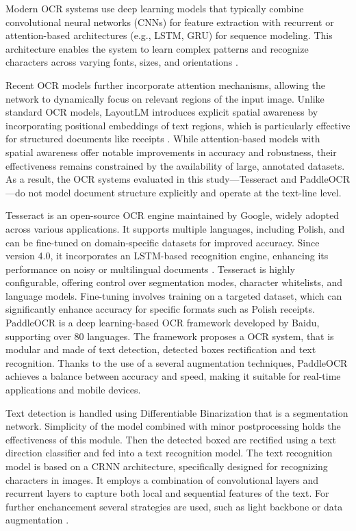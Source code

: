 \documentclass{SGGW-thesis-EN}
\begin{document}
Modern OCR systems use deep learning models that typically combine convolutional neural networks (CNNs) for feature extraction with recurrent or attention-based architectures (e.g., LSTM, GRU) for sequence modeling. This architecture enables the system to learn complex patterns and recognize characters across varying fonts, sizes, and orientations \cite{shi2016endtoend}.

Recent OCR models further incorporate attention mechanisms, allowing the network to dynamically focus on relevant regions of the input image. Unlike standard OCR models, LayoutLM introduces explicit spatial awareness by incorporating positional embeddings of text regions, which is particularly effective for structured documents like receipts \cite{li2020layoutlm}.
While attention-based models with spatial awareness offer notable improvements in accuracy and robustness, their effectiveness remains constrained by the availability of large, annotated datasets. As a result, the OCR systems evaluated in this study—Tesseract and PaddleOCR—do not model document structure explicitly and operate at the text-line level.

Tesseract is an open-source OCR engine maintained by Google, widely adopted across various applications. It supports multiple languages, including Polish, and can be fine-tuned on domain-specific datasets for improved accuracy. Since version 4.0, it incorporates an LSTM-based recognition engine, enhancing its performance on noisy or multilingual documents \cite{smith2007overview, smith2013history}. Tesseract is highly configurable, offering control over segmentation modes, character whitelists, and language models. Fine-tuning involves training on a targeted dataset, which can significantly enhance accuracy for specific formats such as Polish receipts.
\newpage
PaddleOCR is a deep learning-based OCR framework developed by Baidu, supporting over 80 languages. The framework proposes a OCR system,
that is modular and made of text detection, detected boxes rectification and text recognition. Thanks to the use of a several augmentation techniques, PaddleOCR achieves a balance between accuracy and speed, 
making it suitable for real-time applications and mobile devices.

Text detection is handled using Differentiable Binarization that is a segmentation network. Simplicity of the model combined with minor postprocessing
holds the effectiveness of this module. Then the detected boxed are rectified using a text direction classifier and fed into a text recognition model.
The text recognition model is based on a CRNN architecture, specifically designed for recognizing characters in images. 
It employs a combination of convolutional layers and recurrent layers to capture both local and sequential features of the text. 
For further enchancement several strategies are used, such as light backbone or data augmentation \cite{du2020ppocr}. 
\end{document}

